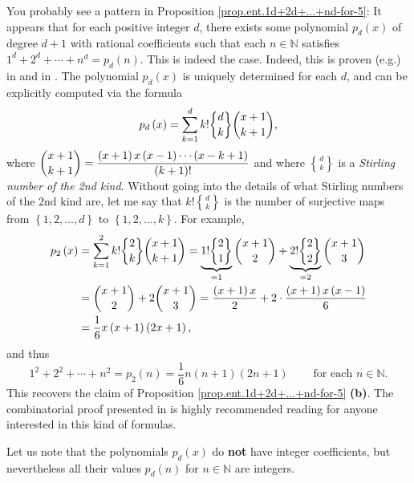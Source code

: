 \documentclass[numbers=enddot,12pt,final,onecolumn,notitlepage]{scrartcl}%
\numberwithin{exer}{subsection}
\theoremstyle{definition}
\newenvironment{fineprint}{\begin{small}}{\end{small}}
\let\sumnonlimits\sum
\renewcommand{\sum}{\sumnonlimits\limits}
\begin{document}
\begin{fineprint}
You probably see a pattern in Proposition \ref{prop.ent.1d+2d+...+nd-for-5}:
It appears that for each positive integer $d$, there exists some polynomial
$p_{d}\left(  x\right)  $ of degree $d+1$ with rational coefficients such that
each $n\in\mathbb{N}$ satisfies $1^{d}+2^{d}+\cdots+n^{d}=p_{d}\left(
n\right)  $. This is indeed the case. Indeed, this is proven (e.g.) in
\cite[Proposition 23.2]{Galvin} and in \cite[Theorem 3.7]{lucas}. The
polynomial $p_{d}\left(  x\right)  $ is uniquely determined for each $d$, and
can be explicitly computed via the formula%
\[
p_{d}\left(  x\right)  =\sum_{k=1}^{d}k!%
\genfrac{\{}{\}}{0pt}{0}{d}{k}%
\dbinom{x+1}{k+1},
\]
where $\dbinom{x+1}{k+1}=\dfrac{\left(  x+1\right)  x\left(  x-1\right)
\cdots\left(  x-k+1\right)  }{\left(  k+1\right)  !}$ and where $%
\genfrac{\{}{\}}{0pt}{0}{d}{k}%
$ is a \textit{Stirling number of the 2nd kind}. Without going into the
details of what Stirling numbers of the 2nd kind are, let me say that $k!%
\genfrac{\{}{\}}{0pt}{0}{d}{k}%
$ is the number of surjective maps from $\left\{  1,2,\ldots,d\right\}  $ to
$\left\{  1,2,\ldots,k\right\}  $. For example,%
\begin{align*}
p_{2}\left(  x\right)   &  =\sum_{k=1}^{2}k!%
\genfrac{\{}{\}}{0pt}{0}{2}{k}%
\dbinom{x+1}{k+1}=\underbrace{1!%
\genfrac{\{}{\}}{0pt}{0}{2}{1}%
}_{=1}\dbinom{x+1}{2}+\underbrace{2!%
\genfrac{\{}{\}}{0pt}{0}{2}{2}%
}_{=2}\dbinom{x+1}{3}\\
&  =\dbinom{x+1}{2}+2\dbinom{x+1}{3}=\dfrac{\left(  x+1\right)  x}{2}%
+2\cdot\dfrac{\left(  x+1\right)  x\left(  x-1\right)  }{6}\\
&  =\dfrac{1}{6}x\left(  x+1\right)  \left(  2x+1\right)  ,
\end{align*}
and thus%
\[
1^{2}+2^{2}+\cdots+n^{2}=p_{2}\left(  n\right)  =\dfrac{1}{6}n\left(
n+1\right)  \left(  2n+1\right)  \ \ \ \ \ \ \ \ \ \ \text{for each }%
n\in\mathbb{N}.
\]
This recovers the claim of Proposition \ref{prop.ent.1d+2d+...+nd-for-5}
\textbf{(b)}. The combinatorial proof presented in \cite[Proposition
23.2]{Galvin} is highly recommended reading for anyone interested in this kind
of formulas.

Let us note that the polynomials $p_{d}\left(  x\right)  $ do \textbf{not}
have integer coefficients, but nevertheless all their values $p_{d}\left(
n\right)  $ for $n\in\mathbb{N}$ are integers.
\end{fineprint}
\end{document}
